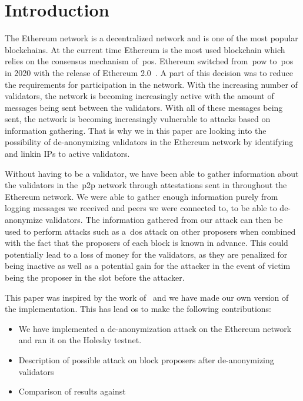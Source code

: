 

\section{Introduction}\label{sec:introduction}
The Ethereum network is a decentralized network and is one of the most popular blockchains.
At the current time Ethereum is the most used blockchain which relies on the consensus mechanism of~\gls{pos}.
Ethereum switched from~\gls{pow} to~\gls{pos} in 2020 with the release of Ethereum 2.0~\cite{EthereumProof-of-stakePoS}.
A part of this decision was to reduce the requirements for participation in the network.
With the increasing number of validators, the network is becoming increasingly active with the amount of messages being sent between the validators.
With all of these messages being sent, the network is becoming increasingly vulnerable to attacks based on information gathering.
That is why we in this paper are looking into the possibility of de-anonymizing validators in the Ethereum network by identifying and linkin IPs to active validators.


Without having to be a validator, we have been able to gather information about the validators in the~\gls{p2p} network through attestations sent in throughout the Ethereum network.
We were able to gather enough information purely from logging messages we received and peers we were connected to, to be able to de-anonymize validators.
The information gathered from our attack can then be used to perform attacks such as a~\gls{dos} attack on other proposers when combined with the fact that the proposers of each block is known in advance.
This could potentially lead to a loss of money for the validators, as they are penalized for being inactive as well as a potential gain for the attacker in the event of victim being the proposer in the slot before the attacker.

This paper was inspired by the work of~\cite{de-anon paper} and we have made our own version of the implementation.
This has lead os to make the following contributions:
\begin{itemize}
    \item We have implemented a de-anonymization attack on the Ethereum network and ran it on the Holesky testnet.
    \item Description of possible attack on block proposers after de-anonymizing validators
    \item Comparison of results against~\cite{de-anon paper}
\end{itemize}
\


